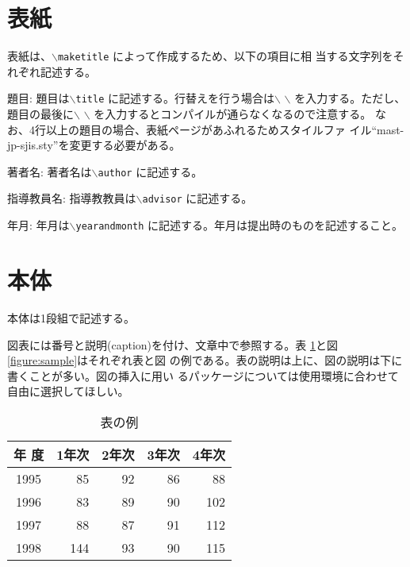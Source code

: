 \documentclass[a4paper,11pt]{jreport}
\begin{document}
\section{表紙}

表紙は、{\tt $\backslash$maketitle} によって作成するため、以下の項目に相
当する文字列をそれぞれ記述する。

\begin{description} \parskip=1pt
\item{題目: }
題目は{\tt $\backslash$title} に記述する。行替えを行う場合は$\backslash$
	   $\backslash$ を入力する。ただし、題目の最後に$\backslash$
	   $\backslash$ を入力するとコンパイルが通らなくなるので注意する。
	   なお、4行以上の題目の場合、表紙ページがあふれるためスタイルファ
	   イル``mast-jp-sjis.sty''を変更する必要がある。
\item{著者名: }
著者名は{\tt $\backslash$author} に記述する。
\item{指導教員名: }
指導教教員は{\tt $\backslash$advisor} に記述する。
\item{年月: }
年月は{\tt $\backslash$yearandmonth} に記述する。年月は提出時のものを記述すること。
\end{description}

\section{本体}

本体は1段組で記述する。

図表には番号と説明(caption)を付け、文章中で参照する。表
\ref{table:fundamental_data_type}と図\ref{figure:sample}はそれぞれ表と図
の例である。表の説明は上に、図の説明は下に書くことが多い。図の挿入に用い
るパッケージについては使用環境に合わせて自由に選択してほしい。

\begin{table}[hbt]
\caption{表の例}
\label{table:fundamental_data_type}
\begin{center}
\begin{tabular}{| c | r | r | r | r |}
\hline
年 度 & 1年次 & 2年次 & 3年次 & 4年次 \\
\hline
1995 & 85 & 92 & 86 & 88 \\
1996 & 83 & 89 & 90 & 102 \\
1997 & 88 & 87 & 91 & 112 \\
1998 & 144 & 93 & 90 & 115 \\
\hline 
\end{tabular}
\end{center}
\end{table}
\medskip
\end{document}
